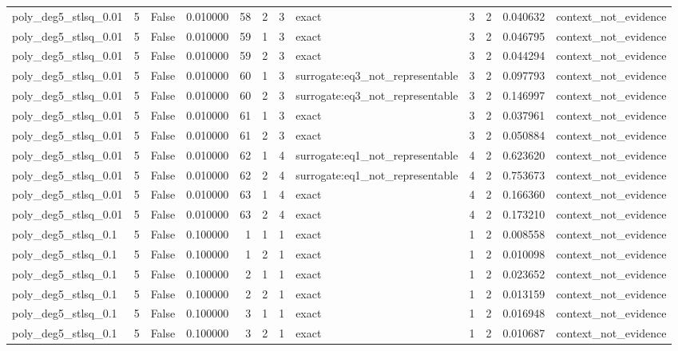 \begin{tabular}{lrrrrrrlrrrl}
poly\_deg5\_stlsq\_0.01 & 5 & False & 0.010000 & 58 & 2 & 3 & exact & 3 & 2 & 0.040632 & context\_not\_evidence \\
poly\_deg5\_stlsq\_0.01 & 5 & False & 0.010000 & 59 & 1 & 3 & exact & 3 & 2 & 0.046795 & context\_not\_evidence \\
poly\_deg5\_stlsq\_0.01 & 5 & False & 0.010000 & 59 & 2 & 3 & exact & 3 & 2 & 0.044294 & context\_not\_evidence \\
poly\_deg5\_stlsq\_0.01 & 5 & False & 0.010000 & 60 & 1 & 3 & surrogate:eq3\_not\_representable & 3 & 2 & 0.097793 & context\_not\_evidence \\
poly\_deg5\_stlsq\_0.01 & 5 & False & 0.010000 & 60 & 2 & 3 & surrogate:eq3\_not\_representable & 3 & 2 & 0.146997 & context\_not\_evidence \\
poly\_deg5\_stlsq\_0.01 & 5 & False & 0.010000 & 61 & 1 & 3 & exact & 3 & 2 & 0.037961 & context\_not\_evidence \\
poly\_deg5\_stlsq\_0.01 & 5 & False & 0.010000 & 61 & 2 & 3 & exact & 3 & 2 & 0.050884 & context\_not\_evidence \\
poly\_deg5\_stlsq\_0.01 & 5 & False & 0.010000 & 62 & 1 & 4 & surrogate:eq1\_not\_representable & 4 & 2 & 0.623620 & context\_not\_evidence \\
poly\_deg5\_stlsq\_0.01 & 5 & False & 0.010000 & 62 & 2 & 4 & surrogate:eq1\_not\_representable & 4 & 2 & 0.753673 & context\_not\_evidence \\
poly\_deg5\_stlsq\_0.01 & 5 & False & 0.010000 & 63 & 1 & 4 & exact & 4 & 2 & 0.166360 & context\_not\_evidence \\
poly\_deg5\_stlsq\_0.01 & 5 & False & 0.010000 & 63 & 2 & 4 & exact & 4 & 2 & 0.173210 & context\_not\_evidence \\
poly\_deg5\_stlsq\_0.1 & 5 & False & 0.100000 & 1 & 1 & 1 & exact & 1 & 2 & 0.008558 & context\_not\_evidence \\
poly\_deg5\_stlsq\_0.1 & 5 & False & 0.100000 & 1 & 2 & 1 & exact & 1 & 2 & 0.010098 & context\_not\_evidence \\
poly\_deg5\_stlsq\_0.1 & 5 & False & 0.100000 & 2 & 1 & 1 & exact & 1 & 2 & 0.023652 & context\_not\_evidence \\
poly\_deg5\_stlsq\_0.1 & 5 & False & 0.100000 & 2 & 2 & 1 & exact & 1 & 2 & 0.013159 & context\_not\_evidence \\
poly\_deg5\_stlsq\_0.1 & 5 & False & 0.100000 & 3 & 1 & 1 & exact & 1 & 2 & 0.016948 & context\_not\_evidence \\
poly\_deg5\_stlsq\_0.1 & 5 & False & 0.100000 & 3 & 2 & 1 & exact & 1 & 2 & 0.010687 & context\_not\_evidence \\

\end{tabular}
